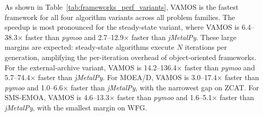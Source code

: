 \documentclass[journal]{IEEEtran}
\newcommand{\VAMOS}{VAMOS}
\begin{document}
As shown in Table~\ref{tab:frameworks_perf_variants}, \VAMOS{} is the fastest framework for all four algorithm variants across all problem families. The speedup is most pronounced for the steady-state variant, where \VAMOS{} is 6.4--38.3$\times$ faster than \textit{pymoo} and 2.7--12.9$\times$ faster than \textit{jMetalPy}. These large margins are expected: steady-state algorithms execute $N$ iterations per generation, amplifying the per-iteration overhead of object-oriented frameworks. For the external-archive variant, \VAMOS{} is 14.2--136.4$\times$ faster than \textit{pymoo} and 5.7--74.4$\times$ faster than \textit{jMetalPy}. For MOEA/D, \VAMOS{} is 3.0--17.4$\times$ faster than \textit{pymoo} and 1.0--6.6$\times$ faster than \textit{jMetalPy}, with the narrowest gap on ZCAT. For SMS-EMOA, \VAMOS{} is 4.6--13.3$\times$ faster than \textit{pymoo} and 1.6--5.1$\times$ faster than \textit{jMetalPy}, with the smallest margin on WFG.


\end{document}
